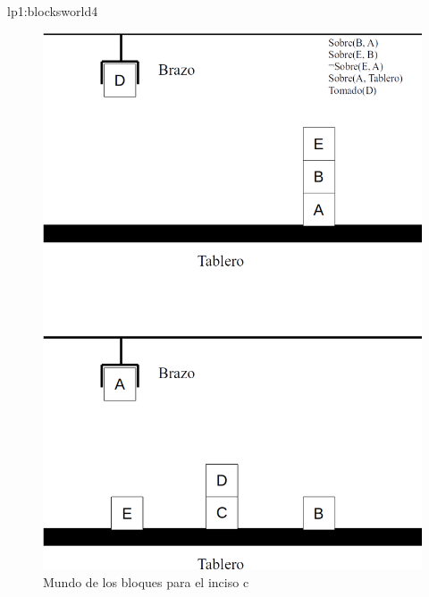 \begin{defproblem}{lp1:blocksworld4}
\begin{onlyproblem}
		\begin{figure}
			\centering
			\includegraphics[width=0.7\linewidth]{Blocksworld4}
			\caption{Mundo de los bloques para el inciso c}
			\label{fig:blocksworld4}
		\end{figure}
	
	\end{onlyproblem}%
	\begin{onlysolution}%
		
	\end{onlysolution}%
\end{defproblem}
